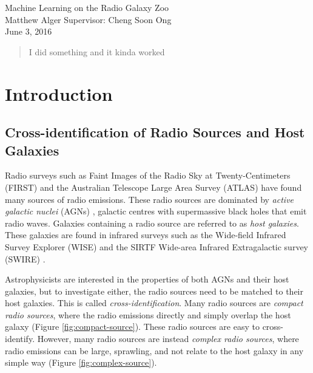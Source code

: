 \documentclass[a4paper]{article}
\newcommand{\fig}{Figure }
\begin{document}
  {\Large\noindent  Machine Learning on the Radio Galaxy Zoo}\\

  {\large\noindent  Matthew Alger \hfill Supervisor: Cheng Soon Ong}\\

  {\large\noindent  June 3, 2016}\\

  \begin{abstract}
    I did something and it kinda worked
  \end{abstract}

  \section{Introduction}

    \subsection{Cross-identification of Radio Sources and Host Galaxies}

      Radio surveys such as Faint Images of the Radio Sky at Twenty-Centimeters (FIRST) \cite{white97,becker95} and the Australian Telescope Large Area Survey (ATLAS) \cite{franzen15} have found many sources of radio emissions. These radio sources are dominated by \emph{active galactic nuclei} (AGNs) \cite{banfield15}, galactic centres with supermassive black holes that emit radio waves\cite{peterson97}. Galaxies containing a radio source are referred to as \emph{host galaxies}. These galaxies are found in infrared surveys such as the Wide-field Infrared Survey Explorer (WISE) \cite{wright10} and the SIRTF Wide-area Infrared Extragalactic survey (SWIRE) \cite{surace05,lonsdale03}.

      Astrophysicists are interested in the properties of both AGNs and their host galaxies, but to investigate either, the radio sources need to be matched to their host galaxies. This is called \emph{cross-identification}. Many radio sources are \emph{compact radio sources}, where the radio emissions directly and simply overlap the host galaxy (\fig \ref{fig:compact-source}). These radio sources are easy to cross-identify\cite{banfield15}. However, many radio sources are instead \emph{complex radio sources}, where radio emissions can be large, sprawling, and not relate to the host galaxy in any simple way (\fig \ref{fig:complex-source}).
\end{document}
